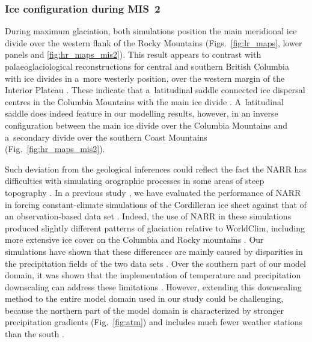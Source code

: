 \documentclass[tc, manuscript]{copernicus}
\begin{document}
\subsubsection{Ice configuration during MIS~2}
\label{sec:mis2}

      During maximum glaciation, both simulations position the main
      meridional ice divide over the western flank of the Rocky Mountains
      (Figs.~\ref{fig:lr_maps}, lower panels and \ref{fig:hr_maps_mis2}).
      This result appears to contrast with palaeoglaciological
      reconstructions for central and southern British Columbia with ice
      divides in a~more westerly position, over the western margin of the
      Interior Plateau \citep{Ryder.etal.1991, Stumpf.etal.2000,
      Kleman.etal.2010, Clague.Ward.2011, Margold.etal.2013a}. These
      indicate that a~latitudinal saddle connected ice dispersal centres in
      the Columbia Mountains with the main ice divide
      \citep{Ryder.etal.1991, Kleman.etal.2010, Clague.Ward.2011,
      Margold.etal.2013a}. A~latitudinal saddle does indeed feature in our
      modelling results, however, in an inverse configuration between the
      main ice divide over the Columbia Mountains and a~secondary divide
      over the southern Coast Mountains (Fig.~\ref{fig:hr_maps_mis2}).

      Such deviation from the geological inferences could reflect the fact
      the NARR has difficulties with simulating orographic processes in some
      areas of steep topography \citep{Jarosch.etal.2012}. In a previous
      study \citep{Seguinot.etal.2014}, we have evaluated the performance of
      NARR in forcing constant-climate simulations of the Cordilleran ice
      sheet against that of an observation-based data set
      \citep[WorldClim,][]{Hijmans.etal.2005}. Indeed, the use of NARR in
      these simulations produced slightly different patterns of glaciation
      relative to WorldClim, including more extensive ice cover on the
      Columbia and Rocky mountains \citep[Figs.~6--7]{Seguinot.etal.2014}.
      Our simulations have shown that these differences are mainly caused by
      disparities in the precipitation fields of the two data sets
      \citep[Figs.13--14]{Seguinot.etal.2014}. Over the southern part of our
      model domain, it was shown that the implementation of temperature and
      precipitation downscaling can address these limitations
      \citep[e.g.,][]{Jarosch.etal.2012}. However, extending this
      downscaling method to the entire model domain used in our study could
      be challenging, because the northern part of the model domain is
      characterized by stronger precipitation gradients (Fig.~\ref{fig:atm})
      and includes much fewer weather stations than the south
      \citep{Hijmans.etal.2005}.
\end{document}

